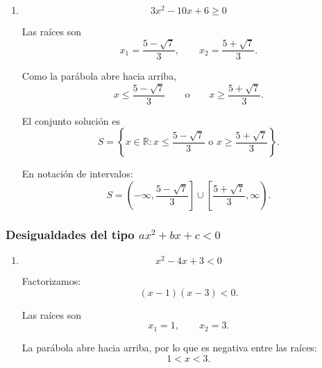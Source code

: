 \documentclass[12pt]{article}
\theoremstyle{plain}
\theoremstyle{definition}
\theoremstyle{remark}
\begin{document}
{\begin{enumerate}
Multiplicamos por \(2\):
\[
2x^2+x-1\geq0.
\]

Factorizamos:
\[
(2x-1)(x+1)\geq0.
\]

Las raíces son
\[
x_1=-1,
\qquad
x_2=\frac{1}{2}.
\]

Por tanto,
\[
x\leq-1
\qquad\text{o}\qquad
x\geq\frac{1}{2}.
\]

El conjunto solución es
\[
\boxed{
S=
\left\{
x\in\mathbb{R}:
x\leq-1
\text{ o }
x\geq\frac{1}{2}
\right\}.
}
\]

En notación de intervalos:
\[
\boxed{
S=
(-\infty,-1]
\cup
\left[\frac{1}{2},\infty\right).
}
\]

Representación gráfica:
\[
\longleftarrow\!\!=\!\!=\!\bullet
\quad-1
\qquad\qquad
\frac{1}{2}\quad
\bullet\!\!=\!\!=\!\longrightarrow
\]

\item
\[
3x^2-10x+6\geq0
\]

Las raíces son
\[
x_1=\frac{5-\sqrt{7}}{3},
\qquad
x_2=\frac{5+\sqrt{7}}{3}.
\]

Como la parábola abre hacia arriba,
\[
x\leq
\frac{5-\sqrt{7}}{3}
\qquad\text{o}\qquad
x\geq
\frac{5+\sqrt{7}}{3}.
\]

El conjunto solución es
\[
\boxed{
S=
\left\{
x\in\mathbb{R}:
x\leq\frac{5-\sqrt{7}}{3}
\text{ o }
x\geq\frac{5+\sqrt{7}}{3}
\right\}.
}
\]

En notación de intervalos:
\[
\boxed{
S=
\left(
-\infty,
\frac{5-\sqrt{7}}{3}
\right]
\cup
\left[
\frac{5+\sqrt{7}}{3},
\infty
\right).
}
\]

\end{enumerate}

\subsubsection*{Desigualdades del tipo \(ax^2+bx+c<0\)}
\begin{enumerate}

\item
\[
x^2-4x+3<0
\]

Factorizamos:
\[
(x-1)(x-3)<0.
\]

Las raíces son
\[
x_1=1,
\qquad
x_2=3.
\]

La parábola abre hacia arriba, por lo que es negativa entre las raíces:
\[
1<x<3.
\]


\end{enumerate}}
\end{document}
